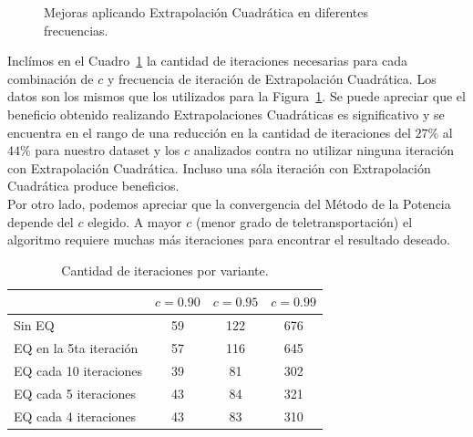\begin{figure}[!htbp]
{    }
    \caption{\label{fig:eq_c} Mejoras aplicando Extrapolación Cuadrática en diferentes frecuencias.}
\end{figure}

Inclímos en el Cuadro~\ref{tab:iteraciones} la cantidad de iteraciones
necesarias para cada combinación de $c$ y frecuencia de iteración de
Extrapolación Cuadrática. Los datos son los mismos que los utilizados para la
Figura~\ref{fig:eq_c}. Se puede apreciar que el beneficio obtenido realizando
Extrapolaciones Cuadráticas es significativo y se encuentra en el rango de una
reducción en la cantidad de iteraciones del $27\%$ al $44\%$ para nuestro
dataset y los $c$ analizados contra no utilizar ninguna iteración con
Extrapolación Cuadrática. Incluso una sóla iteración con Extrapolación
Cuadrática produce beneficios.\\

Por otro lado, podemos apreciar que la convergencia del Método de la Potencia
depende del $c$ elegido. A mayor $c$ (menor grado de teletransportación) el
algoritmo requiere muchas más iteraciones para encontrar el resultado deseado.

\begin{table}[!htbp]
    \centering
    \begin{tabular}{|l|c|c|c|} \hline
                                    & $c=0.90$  & $c=0.95$  & $c=0.99$  \\ \hline
        Sin EQ                      & 59        & 122       & 676       \\ \hline
        EQ en la 5ta iteración      & 57        & 116       & 645       \\ \hline
        EQ cada 10 iteraciones      & 39        & 81        & 302       \\ \hline
        EQ cada 5 iteraciones       & 43        & 84        & 321       \\ \hline
        EQ cada 4 iteraciones       & 43        & 83        & 310       \\ \hline
    \end{tabular}
    \caption{Cantidad de iteraciones por variante.}\label{tab:iteraciones}
\end{table}
